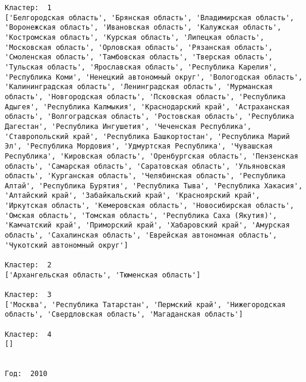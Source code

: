 \documentclass[11pt]{article}
\begin{document}
\begin{Verbatim}[commandchars=\\\{\}]
Кластер:  1
['Белгородская область', 'Брянская область', 'Владимирская область', 'Воронежская область', 'Ивановская область', 'Калужская область', 'Костромская область', 'Курская область', 'Липецкая область', 'Московская область', 'Орловская область', 'Рязанская область', 'Смоленская область', 'Тамбовская область', 'Тверская область', 'Тульская область', 'Ярославская область', 'Республика Карелия', 'Республика Коми', 'Ненецкий автономный округ', 'Вологодская область', 'Калинингpадская область', 'Ленинградская область', 'Мурманская область', 'Новгородская область', 'Псковская область', 'Республика Адыгея', 'Республика Калмыкия', 'Краснодарский край', 'Астраханская область', 'Волгоградская область', 'Ростовская область', 'Республика Дагестан', 'Республика Ингушетия', 'Чеченская Республика', 'Ставропольский край', 'Республика Башкортостан', 'Республика Марий Эл', 'Республика Мордовия', 'Удмуртская Республика', 'Чувашская Республика', 'Кировская область', 'Оренбургская область', 'Пензенская область', 'Самарская область', 'Саратовская область', 'Ульяновская область', 'Курганская область', 'Челябинская область', 'Республика Алтай', 'Республика Бурятия', 'Республика Тыва', 'Республика Хакасия', 'Алтайский край', 'Забайкальский край', 'Красноярский край', 'Иркутская область', 'Кемеровская область', 'Новосибирская область', 'Омская область', 'Томская область', 'Республика Саха (Якутия)', 'Камчатский край', 'Приморский край', 'Хабаровский край', 'Амурская область', 'Сахалинская область', 'Еврейская автономная область', 'Чукотский автономный округ']

Кластер:  2
['Архангельская область', 'Тюменская область']

Кластер:  3
['Москва', 'Республика Татарстан', 'Пермский край', 'Нижегородская область', 'Свердловская область', 'Магаданская область']

Кластер:  4
[]


Год:  2010


\end{Verbatim}
\end{document}
